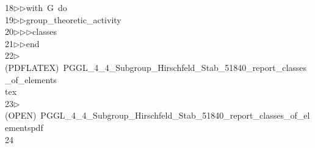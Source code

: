 \begin{tabbing}
18\>$\triangleright$\>$\triangleright$\>with\ G\ do\ \\[0pt]
19\>$\triangleright$\>$\triangleright$\>group\_theoretic\_activity\ \\[0pt]
20\>$\triangleright$\>$\triangleright$\>$\triangleright$\>classes\ \\[0pt]
21\>$\triangleright$\>$\triangleright$\>end\\[0pt]
22\>$\triangleright$\>(PDFLATEX)\ PGGL\_4\_4\_Subgroup\_Hirschfeld\_Stab\_51840\_report\_classes\_of\_elements\\[0pt]
\>tex\\[0pt]
23\>$\triangleright$\>(OPEN)\ PGGL\_4\_4\_Subgroup\_Hirschfeld\_Stab\_51840\_report\_classes\_of\_elementspdf\\[0pt]
24\>\end{tabbing}
